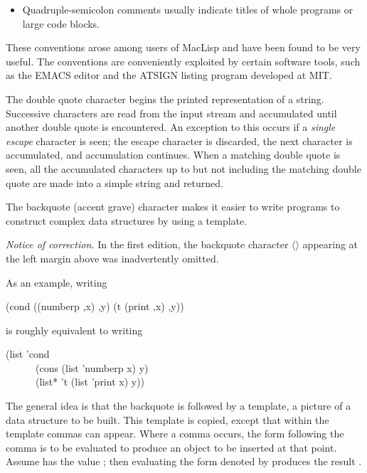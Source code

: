 \begin{flushdesc}
\begin{itemize}
\item
Quadruple-semicolon comments usually indicate titles of whole programs or large code blocks.
\end{itemize}

\beforenoterule
\begin{incompatibility}
These conventions arose among users of MacLisp
and have been found to be very useful.
The conventions are conveniently exploited by certain software tools,
such as the {EMACS} editor and the
{ATSIGN} listing program developed at {MIT}.
\end{incompatibility}
\afternoterule

\item[\cd{"}]
The double quote character begins the printed representation
of a string.
Successive characters are read from the input stream and accumulated until
another double quote is encountered.
An exception to this occurs if a \emph{single escape} character
is seen; the escape character is discarded,
the next character is accumulated, and accumulation
continues.  When a matching double quote is seen, all the accumulated
characters up to but not including the matching double quote are
made into a simple string and returned.

\item[\cd{{\Xbq}}]
The backquote (accent grave) character
makes it easier to write programs to construct complex data structures by
using a template.
\label{BACKQUOTE}
\begin{new}%
\emph{Notice of correction.}
In the first edition, the backquote character $\langle$\cd{\Xbq}$\rangle$
appearing at the left margin above was inadvertently omitted.
\end{new}
As an example, writing
\begin{lisp}
{\Xbq}(cond ((numberp ,x) ,{\Xatsign}y) (t (print ,x) ,{\Xatsign}y))
\end{lisp}
is roughly equivalent to writing
\begin{lisp}
(list 'cond  \\
~~~~~~(cons (list 'numberp x) y)  \\
~~~~~~(list* 't (list 'print x) y))
\end{lisp}
The general idea is that the backquote is followed by a template,
a picture of a data structure to be built.  This template is copied,
except that within the template commas can appear.  Where a comma
occurs, the form following the comma is to be evaluated to produce an object to
be inserted at that point.  Assume  has the value ; then
evaluating the form denoted by  produces
the result .


\end{flushdesc}
